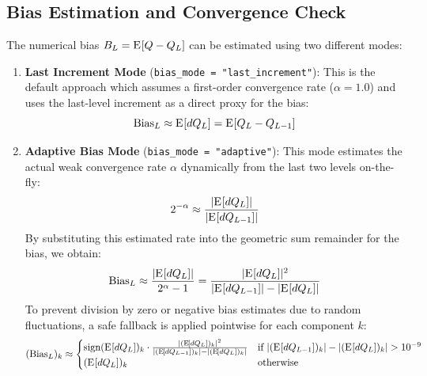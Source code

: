 \documentclass[preprint,12pt]{elsarticle}
\newcommand{\qoi}{Q}
\newcommand{\maxl}{L}
\newcommand{\weakrate}{\alpha}
\newcommand{\E}[1]{{\ensuremath{\mathrm{E}}\mspace{-2mu}\left[#1\right]}}
\begin{document}
\subsection{Bias Estimation and Convergence Check}
The numerical bias $B_\maxl = \E{\qoi - \qoi_\maxl}$ can be estimated using two different modes:
\begin{enumerate}
    \item \textbf{Last Increment Mode} (\texttt{bias\_mode = "last\_increment"}):
    This is the default approach which assumes a first-order convergence rate ($\weakrate = 1.0$) and uses the last-level increment as a direct proxy for the bias:
    \begin{equation}
    \text{Bias}_\maxl \approx \E{d\qoi_\maxl} = \E{\qoi_\maxl - \qoi_{\maxl-1}}
    \end{equation}
    
    \item \textbf{Adaptive Bias Mode} (\texttt{bias\_mode = "adaptive"}):
    This mode estimates the actual weak convergence rate $\weakrate$ dynamically from the last two levels on-the-fly:
    \begin{equation}
    2^{-\weakrate} \approx \frac{|\E{d\qoi_\maxl}|}{|\E{d\qoi_{\maxl-1}}|}
    \end{equation}
    By substituting this estimated rate into the geometric sum remainder for the bias, we obtain:
    \begin{equation}
    \text{Bias}_\maxl \approx \frac{|\E{d\qoi_\maxl}|}{2^\weakrate - 1} = \frac{|\E{d\qoi_\maxl}|^2}{|\E{d\qoi_{\maxl-1}}| - |\E{d\qoi_\maxl}|}
    \end{equation}
    To prevent division by zero or negative bias estimates due to random fluctuations, a safe fallback is applied pointwise for each component $k$:
    \begin{equation}
    (\text{Bias}_\maxl)_k \approx \begin{cases}
    \text{sign}(\E{d\qoi_\maxl})_k \cdot \frac{|(\E{d\qoi_\maxl})_k|^2}{|(\E{d\qoi_{\maxl-1}})_k| - |(\E{d\qoi_\maxl})_k|} & \text{if } |(\E{d\qoi_{\maxl-1}})_k| - |(\E{d\qoi_\maxl})_k| > 10^{-9} \\
    (\E{d\qoi_\maxl})_k & \text{otherwise}
    \end{cases}
    \end{equation}
\end{enumerate}
\end{document}
